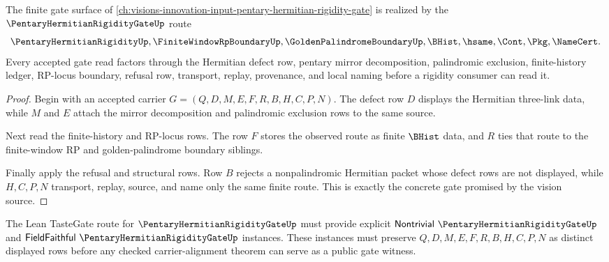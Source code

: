 \begin{theorem}
\label{thm:pentary-hermitian-rigidity-gate-vision-handoff}
The finite gate surface of \autoref{ch:visions-innovation-input-pentary-hermitian-rigidity-gate} is realized by the $\PentaryHermitianRigidityGateUp$ route
$$
\PentaryHermitianRigidityUp,\FiniteWindowRpBoundaryUp,\GoldenPalindromeBoundaryUp,\BHist,\hsame,\Cont,\Pkg,\NameCert .
$$
Every accepted gate read factors through the Hermitian defect row, pentary mirror decomposition, palindromic exclusion, finite-history ledger, RP-locus boundary, refusal row, transport, replay, provenance, and local naming before a rigidity consumer can read it.
\end{theorem}
\begin{proof}
Begin with an accepted carrier $G=(Q,D,M,E,F,R,B,H,C,P,N)$. The defect row $D$ displays the Hermitian three-link data, while $M$ and $E$ attach the mirror decomposition and palindromic exclusion rows to the same source.

Next read the finite-history and RP-locus rows. The row $F$ stores the observed route as finite $\BHist$ data, and $R$ ties that route to the finite-window RP and golden-palindrome boundary siblings.

Finally apply the refusal and structural rows. Row $B$ rejects a nonpalindromic Hermitian packet whose defect rows are not displayed, while $H,C,P,N$ transport, replay, source, and name only the same finite route. This is exactly the concrete gate promised by the vision source.
\end{proof}



The Lean TasteGate route for $\PentaryHermitianRigidityGateUp$ must provide explicit $\mathsf{Nontrivial}\ \PentaryHermitianRigidityGateUp$ and $\mathsf{FieldFaithful}\ \PentaryHermitianRigidityGateUp$ instances. These instances must preserve $Q,D,M,E,F,R,B,H,C,P,N$ as distinct displayed rows before any checked carrier-alignment theorem can serve as a public gate witness.

